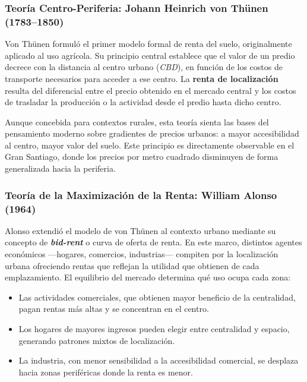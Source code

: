 \documentclass[12pt, letterpaper]{article}
\begin{document}
\subsubsection*{Teoría Centro-Periferia: Johann Heinrich von Thünen (1783--1850)}

Von Thünen formuló el primer modelo formal de renta del suelo, originalmente
aplicado al uso agrícola. Su principio central establece que el valor de un
predio decrece con la distancia al centro urbano (\textit{CBD}), en función de
los costos de transporte necesarios para acceder a ese centro. La \textbf{renta
de localización} resulta del diferencial entre el precio obtenido en el mercado
central y los costos de trasladar la producción o la actividad desde el predio
hasta dicho centro.

Aunque concebida para contextos rurales, esta teoría sienta las bases del
pensamiento moderno sobre gradientes de precios urbanos: a mayor accesibilidad
al centro, mayor valor del suelo. Este principio es directamente observable en
el Gran Santiago, donde los precios por metro cuadrado disminuyen de forma
generalizada hacia la periferia.

\subsubsection*{Teoría de la Maximización de la Renta: William Alonso (1964)}

Alonso extendió el modelo de von Thünen al contexto urbano mediante su
concepto de \textbf{\textit{bid-rent}} o curva de oferta de renta. En este
marco, distintos agentes económicos —hogares, comercios, industrias— compiten
por la localización urbana ofreciendo rentas que reflejan la utilidad que
obtienen de cada emplazamiento. El equilibrio del mercado determina qué uso
ocupa cada zona:

\begin{itemize}[leftmargin=1.5em, itemsep=0.3em]
  \item Las actividades comerciales, que obtienen mayor beneficio de la
        centralidad, pagan rentas más altas y se concentran en el centro.
  \item Los hogares de mayores ingresos pueden elegir entre centralidad y
        espacio, generando patrones mixtos de localización.
  \item La industria, con menor sensibilidad a la accesibilidad comercial,
        se desplaza hacia zonas periféricas donde la renta es menor.
\end{itemize}
\end{document}
